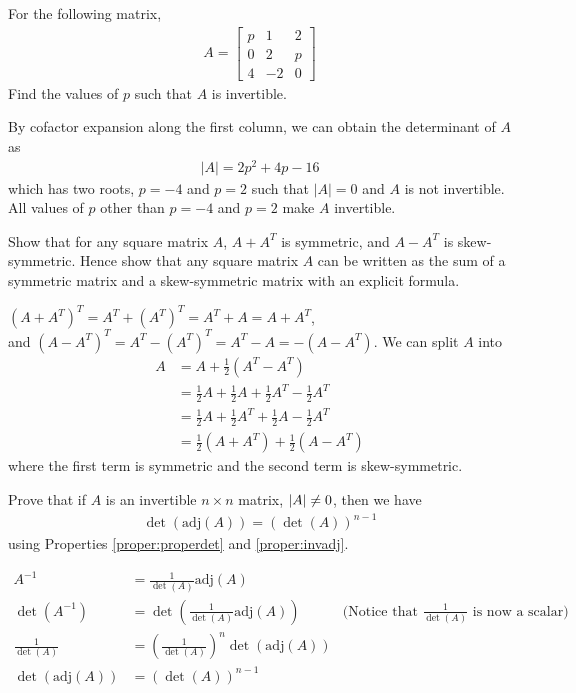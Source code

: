 \begin{Exercise}
For the following matrix,
\begin{align*}
A = 
\begin{bmatrix}
p & 1 & 2\\
0 & 2 & p\\
4 & -2 & 0
\end{bmatrix} 
\end{align*}
Find the values of $p$ such that $A$ is invertible.
\end{Exercise}
\begin{Answer}
By cofactor expansion along the first column, we can obtain the determinant of $A$ as
\begin{align*}
|A| = 2p^2 + 4p - 16
\end{align*}
which has two roots, $p = -4$ and $p = 2$ such that $|A| = 0$ and $A$ is not invertible. All values of $p$ other than $p = -4$ and $p = 2$ make $A$ invertible.
\end{Answer}

\begin{Exercise}
\label{ex:symskew}
Show that for any square matrix $A$, $A + A^T$ is symmetric, and $A - A^T$ is skew-symmetric. Hence show that any square matrix $A$ can be written as the sum of a symmetric matrix and a skew-symmetric matrix with an explicit formula.
\end{Exercise}
\begin{Answer}
$(A + A^T)^T = A^T + (A^T)^T = A^T+A = A+A^T$,\\
and $(A - A^T)^T = A^T - (A^T)^T = A^T-A = -(A - A^T)$. We can split $A$ into
\begin{align*}
A &= A + \frac{1}{2}(A^T - A^T) \\
&= \frac{1}{2}A + \frac{1}{2}A + \frac{1}{2}A^T - \frac{1}{2}A^T \\
&= \frac{1}{2}A + \frac{1}{2}A^T + \frac{1}{2}A - \frac{1}{2}A^T \\
&= \frac{1}{2}(A + A^T) + \frac{1}{2}(A - A^T)
\end{align*}
where the first term is symmetric and the second term is skew-symmetric.
\end{Answer}

\begin{Exercise}
Prove that if $A$ is an invertible $n \times n$ matrix, $\abs{A} \neq 0$, then we have
\begin{align*}
\det(\text{adj}(A))=(\det(A))^{n-1}    
\end{align*}
using Properties \ref{proper:properdet} and \ref{proper:invadj}.
\end{Exercise}
\begin{Answer}
\begin{align*}
A^{-1} &= \frac{1}{\det(A)}\text{adj}(A) \\
\det(A^{-1}) &= \det(\frac{1}{\det(A)}\text{adj}(A)) & \text{(Notice that $\frac{1}{\det(A)}$ is now a scalar)}\\
\frac{1}{\det(A)} &= (\frac{1}{\det(A)})^n\det(\text{adj}(A)) \\
\det(\text{adj}(A)) &= (\det(A))^{n-1}  
\end{align*}
\end{Answer}